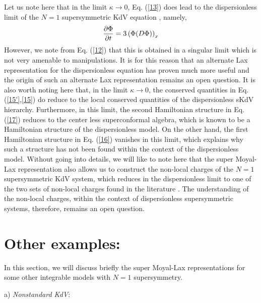 \documentclass[a4paper,11pt]{article}
\begin{document}
Let us note here that in the limit $\kappa\rightarrow 0$,
Eq. (\ref{13}) does lead to the dispersionless limit of the $N=1$
supersymmetric KdV equation \cite{16}, namely,
\begin{equation}
{\partial \Phi\over \partial t} = 3 \left(\Phi(D\Phi)\right)_{x}
\end{equation}
However, we note from Eq. (\ref{12}) that this is obtained in a
singular limit which is not very amenable to manipulations. It is for
this reason that an alternate Lax representation for the
dispersionless equation has proven much more useful \cite{16} and the origin of
such an alternate Lax representation remains an open question. It is
also worth noting here that, in the limit $\kappa\rightarrow 0$, the
conserved quantities in Eq. (\ref{15'},\ref{15}) do reduce to the
local conserved quantities of the dispersionless sKdV
hierarchy. Furthermore, in this limit, the second Hamiltonian
structure in Eq. (\ref{17}) reduces to the center less superconformal
algebra, which is known to be a Hamiltonian structure of the
dispersionless model. On the other hand, the first Hamiltonian
structure in Eq. (\ref{16}) vanishes in this limit, which explains why
such a structure has not been found within the context of the
dispersionless model. Without going into details, we will like to note
here that the super Moyal-Lax representation also allows us to
construct the non-local charges of the $N=1$ supersymmetric KdV
system, which reduces in the dispersionless limit to one of the two
sets of non-local charges found in the literature \cite{16}. The
understanding of the non-local charges, within the context of
dispersionless supersymmetric  systems, therefore, remains an open
question. 

\section{Other examples:}

In this section, we will discuss briefly the super Moyal-Lax
representations for some other integrable models with $N=1$
supersymmetry. 

a) {\it Nonstandard KdV}:
\medskip
\end{document}
